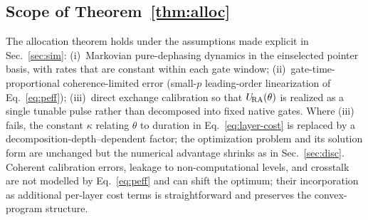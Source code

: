 \subsection{Scope of Theorem~\ref{thm:alloc}}
\label{subsec:alloc-scope}

The allocation theorem holds under the assumptions made explicit in
Sec.~\ref{sec:sim}: (i)~Markovian pure-dephasing dynamics in the
einselected pointer basis, with rates that are constant within each
gate window;
(ii)~gate-time-proportional coherence-limited error (small-$p$
leading-order linearization of Eq.~\eqref{eq:peff});
(iii)~direct exchange calibration so that $U_{\!\mathrm{RA}}(\theta)$ is realized
as a single tunable pulse rather than decomposed into fixed native
gates.
Where (iii) fails, the constant $\kappa$ relating $\theta$ to
duration in Eq.~\eqref{eq:layer-cost} is replaced by a
decomposition-depth--dependent factor; the optimization problem and
its solution form are unchanged but the numerical advantage shrinks
as in Sec.~\ref{sec:disc}.
Coherent calibration errors, leakage to non-computational levels, and
crosstalk are not modelled by Eq.~\eqref{eq:peff} and can shift the
optimum; their incorporation as additional per-layer cost terms is
straightforward and preserves the convex-program structure.
